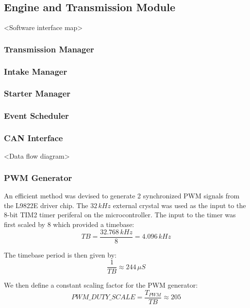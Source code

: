\subsection{Engine and Transmission Module}

<Software interface map>


\subsubsection{Transmission Manager}


\subsubsection{Intake Manager}


\subsubsection{Starter Manager}


\subsubsection{Event Scheduler}


\subsubsection{CAN Interface}

<Data flow diagram>


\subsubsection{PWM Generator}

An efficient method was devised to generate 2 synchronized PWM signals from the L9822E driver chip. The $32\, kHz$ external crystal was used as the input to the 8-bit TIM2 timer periferal on the microcontroller. The input to the timer was first scaled by 8 which provided a timebase:
\begin{equation}
TB=\frac{32.768\, kHz}{8}=4.096\, kHz
\end{equation}

The timebase period is then given by:
\begin{equation}
\frac{1}{TB}\approx244\,\mu{S}
\end{equation}

We then define a constant scaling factor for the PWM generator:
\begin{equation}
{PWM\_DUTY\_SCALE}=\frac{T_{PWM}}{TB}\approx205
\end{equation}

